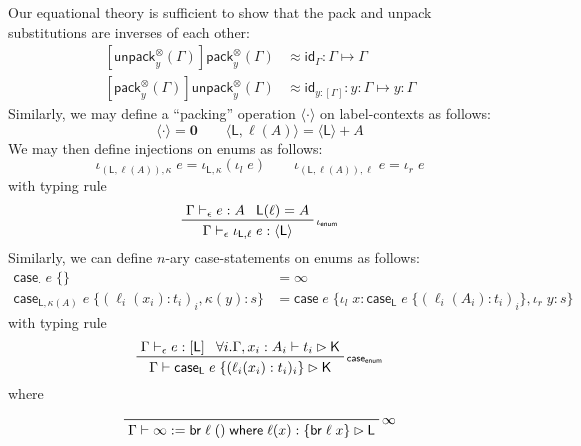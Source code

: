 \documentclass[acmsmall,screen,review]{acmart}
\newcommand{\mb}[1]{\ensuremath{\mathbf{#1}}}
\newcommand{\ms}[1]{\ensuremath{\mathsf{#1}}}
\newcommand{\lto}{:}
\newcommand{\linl}[1]{\iota_l\;{#1}}
\newcommand{\linr}[1]{\iota_r\;{#1}}
\newcommand{\brb}[2]{\ms{br}\;#1\;#2}
\newcommand{\casestmt}[5]{\ms{case}\;#1\;\{\linl{#2} \lto #3, \linr{#4} \lto #5\}}
\newcommand{\where}[2]{#1\;\ms{where}\;#2}
\newcommand{\wbranch}[3]{#1(#2) \lto \{#3\}}
\newcommand{\bhyp}[2]{#1 : #2}
\newcommand{\rle}[1]{{\scriptsize\textsf{#1}}}
\newcommand{\hasty}[4]{#1 \vdash_{#2} #3: {#4}}
\newcommand{\haslb}[3]{#1 \vdash #2 \rhd #3}
\newcommand{\issubst}[3]{#1: #2 \mapsto #3}
\newcommand{\teqv}{\approx}
\newcommand{\pckd}[1]{\langle #1 \rangle}
\begin{document}
Our equational theory is sufficient to show that the pack and unpack substitutions are inverses of
each other:
\begin{equation}
  \begin{aligned}
  \issubst
    {[\ms{unpack}_y^\otimes(\Gamma)]\ms{pack}_y^\otimes(\Gamma) 
      &\teqv \ms{id}_{\Gamma}}{\Gamma}{\Gamma}
  \\
  \issubst
    {[\ms{pack}_y^\otimes(\Gamma)]\ms{unpack}_y^\otimes(\Gamma) &\teqv \ms{id}_{\bhyp{y}{[\Gamma]}}}
    {\bhyp{y}{\Gamma}}{\bhyp{y}{\Gamma}}
  \end{aligned}
\end{equation}
Similarly, we may define a ``packing'' operation $\pckd{\cdot}$ on label-contexts as follows:
\begin{equation}
  \pckd{\cdot} = \mb{0} \qquad \pckd{\ms{L}, \ell(A)} = \pckd{\ms{L}} + A
\end{equation}
We may then define injections on enums as follows:
\begin{equation}
  \iota_{(\ms{L}, \ell(A)), \kappa}\;e = \iota_{\ms{L}, \kappa}(\iota_l\;e) \qquad
  \iota_{(\ms{L}, \ell(A)), \ell}\;e = \iota_r\;e
\end{equation}
with typing rule
\begin{equation}
  \prftree[r]{\rle{$\iota_{\ms{enum}}$}}
    {\hasty{\Gamma}{\epsilon}{e}{A}}
    {\ms{L}(\ell) = A}
    {\hasty{\Gamma}{\epsilon}{\iota_{\ms{L}, \ell}\;e}{\pckd{\ms{L}}}}
\end{equation}
Similarly, we can define $n$-ary case-statements on enums as follows:
\begin{equation}
  \begin{aligned}
  \ms{case}_\cdot\;e\;\{\} &= \infty \\
  \ms{case}_{\ms{L}, \kappa(A)}\;e\;\{(\ell_i(x_i): t_i)_i, \kappa(y): s\}
  &= \casestmt{e}{x}{\ms{case}_{\ms{L}}\;e\;\{(\ell_i(A_i): t_i)_i\}}{y}{s}
  \end{aligned}
\end{equation}
with typing rule
\begin{equation}
  \prftree[r]{\rle{$\ms{case}_{\ms{enum}}$}}
    {\hasty{\Gamma}{\epsilon}{e}{[\ms{L}]}}
    {\forall i. \haslb{\Gamma, \bhyp{x_i}{A_i}}{t_i}{\ms{K}}}
    {\haslb{\Gamma}{\ms{case}_{\ms{L}}\;e\;\{(\ell_i(x_i): t_i)_i\}}{\ms{K}}}
\end{equation}
where
\begin{equation}
  \prftree[r]{$\infty$}
    {\haslb{\Gamma}{\infty := \where{\brb{\ell}{()}}{\wbranch{\ell}{x}{\brb{\ell}{x}}}}{\ms{L}}}
\end{equation}
\end{document}
